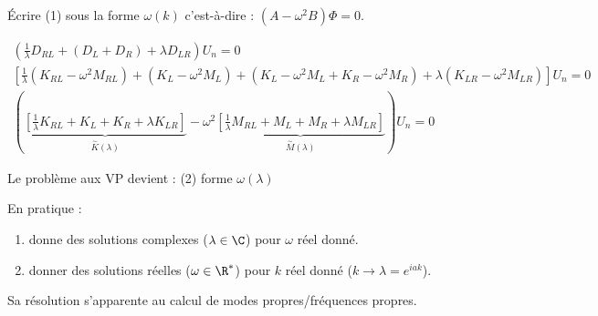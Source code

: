 \documentclass[12pt,a4paper]{article}
\begin{document}
	\begin{exo} $ $\\
		Écrire (1) sous la forme $\omega(k)$ c'est-à-dire : $(A-\omega^2B)\Phi = 0$.
	\end{exo}
	\begin{sol}
		\[\begin{aligned}
			\left(\frac{1}{\lambda}D_{RL}+(D_L+D_R)+\lambda D_{LR}\right)U_n = 0 \\
			\left[\frac{1}{\lambda}(K_{RL}-\omega^2M_{RL})+(K_L-\omega^2M_L)+(K_L-\omega^2M_L+K_R-\omega^2M_R)+\lambda(K_{LR}-\omega^2M_{LR})\right]U_n = 0\\
			\left(\underbrace{\left[\frac{1}{\lambda}K_{RL}+K_L+K_R+\lambda K_{LR}\right]}_{\overset{\sim}{K}(\lambda)}-\omega^2\underbrace{\left[\frac{1}{\lambda}M_{RL}+M_L+M_R+\lambda M_{LR}\right]}_{\overset{\sim}{M}(\lambda)}\right)U_n = 0
		\end{aligned}\]
		
		\begin{minipage}[t]{18cm}
			Le problème aux VP devient :  (2) forme $\omega(\lambda)$
		\end{minipage}
		
		En pratique : \begin{minipage}[t]{15cm}
			
			\vspace{-.3cm}
			
			\begin{enumerate}
				\item donne des solutions complexes ($\lambda \in \C$) pour $\omega$ réel donné.
				\item donner des solutions réelles ($\omega \in \R^*$) pour $k$ réel donné ($k \to \lambda = e^{iak}$).
			\end{enumerate}
			Sa résolution s'apparente au calcul de modes propres/fréquences propres.
		\end{minipage}
	\end{sol}
	
\end{document}
